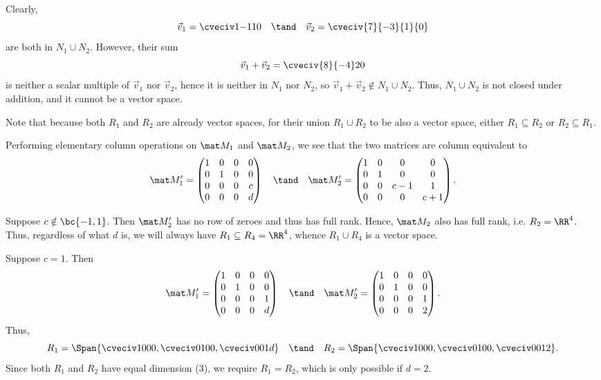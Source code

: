 \begin{solution}
\begin{ppart}
        Clearly, \[\vec v_1 = \cveciv1{-1}10 \quad \tand \quad \vec v_2 = \cveciv{7}{-3}{1}{0}\] are both in $N_1 \cup N_2$. However, their sum \[\vec v_1 + \vec v_2 = \cveciv{8}{-4}20\] is neither a scalar multiple of $\vec v_1$ nor $\vec v_2$, hence it is neither in $N_1$ nor $N_2$, so $\vec v_1 + \vec v_2 \notin N_1 \cup N_2$. Thus, $N_1 \cup N_2$ is not closed under addition, and it cannot be a vector space.
    \end{ppart}
    \begin{ppart}
        Note that because both $R_1$ and $R_2$ are already vector spaces, for their union $R_1 \cup R_2$ to be also a vector space, either $R_1 \subseteq R_2$ or $R_2 \subseteq R_1$.

        Performing elementary column operations on $\mat M_1$ and $\mat M_2$, we see that the two matrices are column equivalent to \[\mat M_1' = \begin{pmatrix}1 & 0 & 0 & 0 \\ 0 & 1 & 0 & 0 \\ 0 & 0 & 0 & c \\ 0 & 0 & 0 & d\end{pmatrix} \quad \tand \quad \mat M_2' = \begin{pmatrix}1 & 0 & 0 & 0 \\ 0 & 1 & 0 & 0 \\ 0 & 0 & c-1 & 1 \\ 0 & 0 & 0 & c+1 \end{pmatrix}.\]

         Suppose $c \notin \bc{-1, 1}$. Then $\mat M_2'$ has no row of zeroes and thus has full rank. Hence, $\mat M_2$ also has full rank, i.e. $R_2 = \RR^4$. Thus, regardless of what $d$ is, we will always have $R_1 \subseteq R_4 = \RR^4$, whence $R_1 \cup R_4$ is a vector space.

         Suppose $c = 1$. Then \[\mat M_1' = \begin{pmatrix}1 & 0 & 0 & 0 \\ 0 & 1 & 0 & 0 \\ 0 & 0 & 0 & 1 \\ 0 & 0 & 0 & d\end{pmatrix} \quad \tand \quad \mat M_2' = \begin{pmatrix}1 & 0 & 0 & 0 \\ 0 & 1 & 0 & 0 \\ 0 & 0 & 0 & 1 \\ 0 & 0 & 0 & 2 \end{pmatrix}.\] Thus, \[R_1 = \Span{\cveciv1000, \cveciv0100, \cveciv001d} \quad \tand \quad R_2 = \Span{\cveciv1000, \cveciv0100, \cveciv0012}.\] Since both $R_1$ and $R_2$ have equal dimension (3), we require $R_1 = R_2$, which is only possible if $d = 2$.


\end{ppart}
\end{solution}
